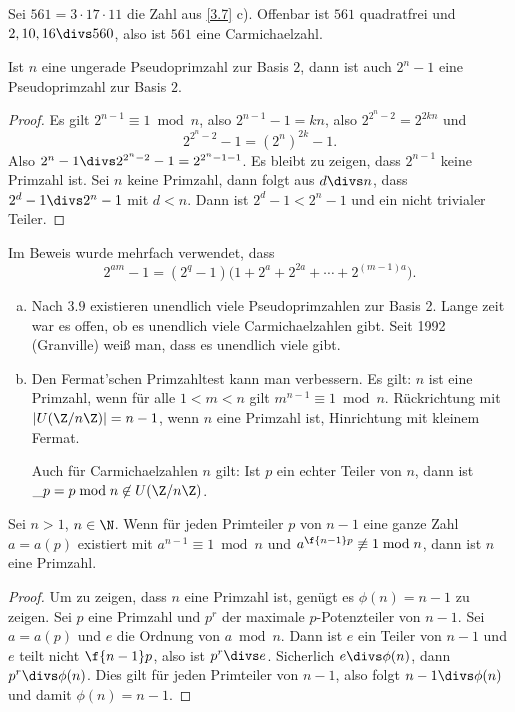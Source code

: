 \begin{ex*}
	Sei $561 = 3 \cdot 17 \cdot 11$ die Zahl aus \ref{3.7} c).
	Offenbar ist $561$ quadratfrei und $2, 10, 16 \divs 560$, also ist $561$ eine Carmichaelzahl.
\end{ex*}

\begin{lem} \label{3.9}
	Ist $n$ eine ungerade Pseudoprimzahl zur Basis $2$, dann ist auch $2^n - 1$ eine Pseudoprimzahl zur Basis $2$.
	\begin{proof}
		Es gilt $2^{n-1} \equiv 1 \bmod n$, also $2^{n-1} - 1 = kn$, also $2^{2^n-2} = 2^{2kn}$ und
		\[
			2^{2^n -2} - 1 = (2^n)^{2k} - 1.
		\]
		Also $2^n - 1 \divs 2^{2^n -2} - 1 = 2^{2^n - 1 - 1}$.
		Es bleibt zu zeigen, dass $2^{n-1}$ keine Primzahl ist.
		Sei $n$ keine Primzahl, dann folgt aus $d \divs n$, dass $2^d - 1 \divs 2^n - 1$ mit $d < n$.
		Dann ist $2^d - 1 < 2^n - 1$ und ein nicht trivialer Teiler.
	\end{proof}
	\begin{note}
		Im Beweis wurde mehrfach verwendet, dass
		\[
			2^{am} - 1
			= (2^q - 1)\Big(1 + 2^a + 2^{2a} + \dotsb + 2^{(m-1)a} \Big).
		\]
	\end{note}
\end{lem}

\begin{nt*}
	\begin{enumerate}[a)]
		\item
			Nach $3.9$ existieren unendlich viele Pseudoprimzahlen zur Basis 2.
			Lange zeit war es offen, ob es unendlich viele Carmichaelzahlen gibt.
			Seit 1992 (Granville) weiß man, dass es unendlich viele gibt.
		\item
			Den Fermat'schen Primzahltest kann man verbessern.
			Es gilt: $n$ ist eine Primzahl, wenn für alle $1 < m < n$ gilt $m^{n-1} \equiv 1 \bmod n$.
			Rückrichtung mit $| U(\Z/n\Z) | = n-1$, wenn $n$ eine Primzahl ist, Hinrichtung mit kleinem Fermat.

			Auch für Carmichaelzahlen $n$ gilt:
			Ist $p$ ein echter Teiler von $n$, dann ist $\_p = p \bmod n \not\in U(\Z / n\Z)$.
	\end{enumerate}
\end{nt*}

\begin{st}[Lucas] \label{3.10}
	Sei $n > 1$, $n \in \N$.
	Wenn für jeden Primteiler $p$ von $n - 1$ eine ganze Zahl $a = a(p)$ existiert mit $a^{n-1} \equiv 1 \bmod n$ und $a^{\f {n-1}p} \not \equiv 1 \bmod n$, dann ist $n$ eine Primzahl.

	\begin{proof}
		Um zu zeigen, dass $n$ eine Primzahl ist, genügt es $\phi(n) = n - 1$ zu zeigen.
		Sei $p$ eine Primzahl und $p^r$ der maximale $p$-Potenzteiler von $n-1$.
		Sei $a = a(p)$ und $e$ die Ordnung von $a \bmod n$.
		Dann ist $e$ ein Teiler von $n-1$ und $e$ teilt nicht $\f {n-1}p$, also ist $p^r \divs e$.
		Sicherlich $e \divs \phi(n)$, dann $p^r \divs \phi(n)$.
		Dies gilt für jeden Primteiler von $n-1$, also folgt $n - 1 \divs \phi(n)$ und damit $\phi(n) = n-1$.
	\end{proof}
\end{st}

